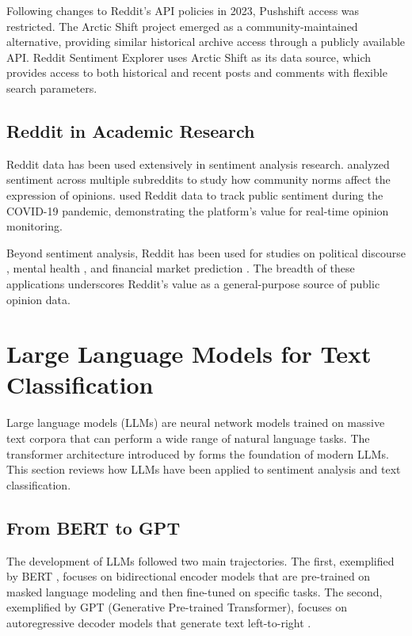 Following changes to Reddit's API policies in 2023, Pushshift access was restricted. The Arctic Shift project emerged as a community-maintained alternative, providing similar historical archive access through a publicly available API. Reddit Sentiment Explorer uses Arctic Shift as its data source, which provides access to both historical and recent posts and comments with flexible search parameters.

\subsection{Reddit in Academic Research}

Reddit data has been used extensively in sentiment analysis research.  analyzed sentiment across multiple subreddits to study how community norms affect the expression of opinions.  used Reddit data to track public sentiment during the COVID-19 pandemic, demonstrating the platform's value for real-time opinion monitoring.

Beyond sentiment analysis, Reddit has been used for studies on political discourse \cite{soliman2019characterization}, mental health \cite{coppersmith2018natural}, and financial market prediction \cite{bollen2011twitter}. The breadth of these applications underscores Reddit's value as a general-purpose source of public opinion data.

\section{Large Language Models for Text Classification}
\label{sec:llm_classification}

Large language models (LLMs) are neural network models trained on massive text corpora that can perform a wide range of natural language tasks. The transformer architecture introduced by  forms the foundation of modern LLMs. This section reviews how LLMs have been applied to sentiment analysis and text classification.

\subsection{From BERT to GPT}

The development of LLMs followed two main trajectories. The first, exemplified by BERT \cite{devlin2019bert}, focuses on bidirectional encoder models that are pre-trained on masked language modeling and then fine-tuned on specific tasks. The second, exemplified by GPT (Generative Pre-trained Transformer), focuses on autoregressive decoder models that generate text left-to-right \cite{radford2019language}.

